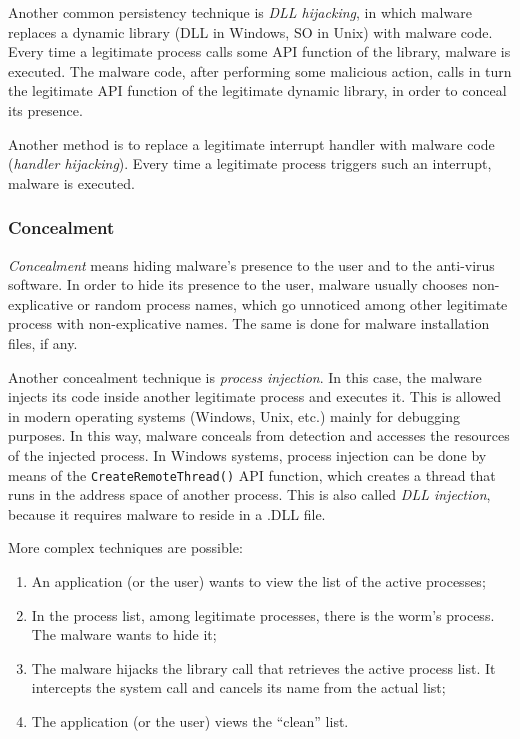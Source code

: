 \documentclass[a4paper,12pt]{article}
\begin{document}
Another common persistency technique is \textit{DLL hijacking}, in which malware replaces a dynamic library (DLL in Windows, SO in Unix) with malware code. Every time a legitimate process calls some API function of the library, malware is executed. The malware code, after performing some malicious action, calls in turn the legitimate API function of the legitimate dynamic library, in order to conceal its presence.

Another method is to replace a legitimate interrupt handler with malware code (\textit{handler hijacking}). Every time a legitimate process triggers such an interrupt, malware is executed.

\subsubsection{Concealment}
\textit{Concealment} means hiding malware’s presence to the user and to the anti-virus software. In order to hide its presence to the user, malware usually chooses non-explicative or random process names, which go unnoticed among other legitimate process with non-explicative names. The same is done for malware installation files, if any.

Another concealment technique is \textit{process injection}. In this case, the malware injects its code inside another legitimate process and executes it. This is allowed in modern operating systems (Windows, Unix, etc.) mainly for debugging purposes. In this way, malware conceals from detection and accesses the resources of the injected process.
In Windows systems, process injection can be done by means of the \texttt{CreateRemoteThread()} API function, which creates a thread that runs in the address space of another process. This is also called \textit{DLL injection}, because it requires malware to reside in a .DLL file.

More complex techniques are possible:
\begin{enumerate}
	\item An application (or the user) wants to view the list of the active processes;
	\item In the process list, among legitimate processes, there is the worm's process. The malware wants to hide it;
	\item The malware hijacks the library call that retrieves the active process list. It intercepts the system call and cancels its name from the actual list;
	\item The application (or the user) views the “clean” list.
\end{enumerate}
\end{document}
